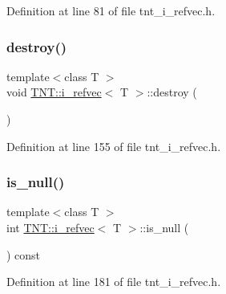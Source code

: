 Definition at line 81 of file tnt\+\_\+i\+\_\+refvec.\+h.

\mbox{\label{classTNT_1_1i__refvec_ae92db69e3b80c46a51a14d8403df4c15}} 
\subsubsection{\texorpdfstring{destroy()}{destroy()}}
{\footnotesize\ttfamily template$<$class T $>$ \\
void \hyperlink{classTNT_1_1i__refvec}{T\+N\+T\+::i\+\_\+refvec}$<$ T $>$\+::destroy (\begin{DoxyParamCaption}{ }\end{DoxyParamCaption})\hspace{0.3cm}{\ttfamily [inline]}}



Definition at line 155 of file tnt\+\_\+i\+\_\+refvec.\+h.

\mbox{\label{classTNT_1_1i__refvec_af8d1a8ae488bd686ad6b563d6fc06e3a}} 
\subsubsection{\texorpdfstring{is\+\_\+null()}{is\_null()}}
{\footnotesize\ttfamily template$<$class T $>$ \\
int \hyperlink{classTNT_1_1i__refvec}{T\+N\+T\+::i\+\_\+refvec}$<$ T $>$\+::is\+\_\+null (\begin{DoxyParamCaption}{ }\end{DoxyParamCaption}) const\hspace{0.3cm}{\ttfamily [inline]}}



Definition at line 181 of file tnt\+\_\+i\+\_\+refvec.\+h.

\mbox{\label{classTNT_1_1i__refvec_a9957dd1544849ec1241fb9b7356daff0}} 
